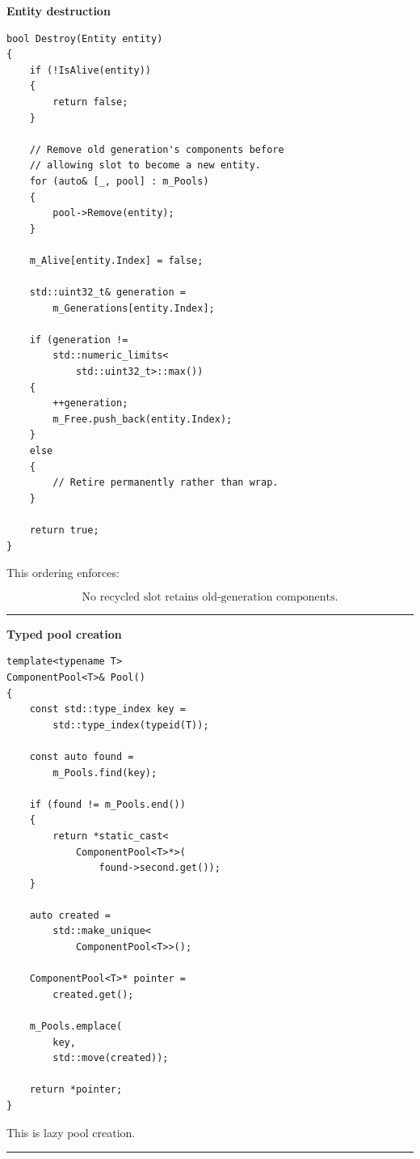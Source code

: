 \textbf{Entity destruction}

\begin{verbatim}
bool Destroy(Entity entity)
{
    if (!IsAlive(entity))
    {
        return false;
    }

    // Remove old generation's components before
    // allowing slot to become a new entity.
    for (auto& [_, pool] : m_Pools)
    {
        pool->Remove(entity);
    }

    m_Alive[entity.Index] = false;

    std::uint32_t& generation =
        m_Generations[entity.Index];

    if (generation !=
        std::numeric_limits<
            std::uint32_t>::max())
    {
        ++generation;
        m_Free.push_back(entity.Index);
    }
    else
    {
        // Retire permanently rather than wrap.
    }

    return true;
}
\end{verbatim}

This ordering enforces:

\[
\boxed{
\text{No recycled slot retains old-generation components}.
}
\]

\begin{center}\rule{0.5\linewidth}{0.5pt}\end{center}

\textbf{Typed pool creation}

\begin{verbatim}
template<typename T>
ComponentPool<T>& Pool()
{
    const std::type_index key =
        std::type_index(typeid(T));

    const auto found =
        m_Pools.find(key);

    if (found != m_Pools.end())
    {
        return *static_cast<
            ComponentPool<T>*>(
                found->second.get());
    }

    auto created =
        std::make_unique<
            ComponentPool<T>>();

    ComponentPool<T>* pointer =
        created.get();

    m_Pools.emplace(
        key,
        std::move(created));

    return *pointer;
}
\end{verbatim}

This is lazy pool creation.

\begin{center}\rule{0.5\linewidth}{0.5pt}\end{center}

